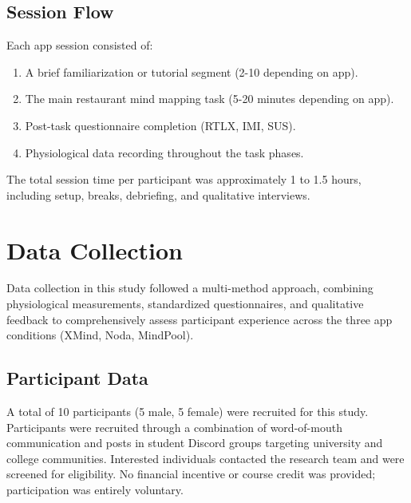 \documentclass{CPP}
\begin{document}
\subsection{Session Flow}
Each app session consisted of:
\begin{enumerate}
    \item A brief familiarization or tutorial segment (2-10 depending on app).
    \item The main restaurant mind mapping task (5-20 minutes depending on app).
    \item Post-task questionnaire completion (RTLX, IMI, SUS).
    \item Physiological data recording throughout the task phases.
\end{enumerate}
The total session time per participant was approximately 1 to 1.5 hours, including setup, breaks, debriefing, and qualitative interviews.



\section{Data Collection}

Data collection in this study followed a multi-method approach, combining physiological measurements, standardized questionnaires, and qualitative feedback to comprehensively assess participant experience across the three app conditions (XMind, Noda, MindPool).


\subsection{Participant Data}

A total of 10 participants (5 male, 5 female) were recruited for this study. Participants were recruited through a combination of word-of-mouth communication and posts in student Discord groups targeting university and college communities. Interested individuals contacted the research team and were screened for eligibility. No financial incentive or course credit was provided; participation was entirely voluntary.
\end{document}
